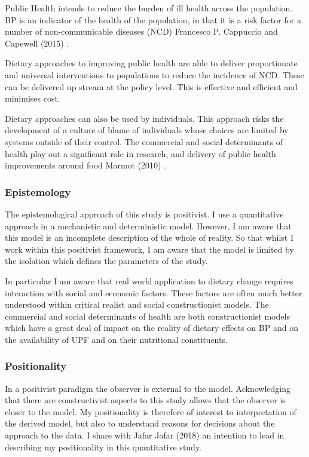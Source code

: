 \documentclass[
]{article}
\begin{document}
Public Health intends to reduce the burden of ill health across the
population. BP is an indicator of the health of the population, in that
it is a risk factor for a number of non-communicable diseases (NCD)
Francesco P. Cappuccio and Capewell (2015) .

Dietary approaches to improving public health are able to deliver
proportionate and universal interventions to populations to reduce the
incidence of NCD. These can be delivered up stream at the policy level.
This is effective and efficient and minimises cost.

Dietary approaches can also be used by individuals. This approach risks
the development of a culture of blame of individuals whose choices are
limited by systems outside of their control. The commercial and social
determinants of health play out a significant role in research, and
delivery of public health improvements around food Marmot (2010) .

\hypertarget{epistemology}{%
\subsubsection{Epistemology}\label{epistemology}}

The epistemological approach of this study is positivist. I use a
quantitative approach in a mechanistic and deterministic model. However,
I am aware that this model is an incomplete description of the whole of
reality. So that whilst I work within this positivist framework, I am
aware that the model is limited by the isolation which defines the
parameters of the study.

In particular I am aware that real world application to dietary change
requires interaction with social and economic factors. These factors are
often much better understood within critical realist and social
constructionist models. The commercial and social determinants of health
are both constructionist models which have a great deal of impact on the
reality of dietary effects on BP and on the availability of UPF and on
their nutritional constituents.

\hypertarget{positionality}{%
\subsubsection{Positionality}\label{positionality}}

In a positivist paradigm the observer is external to the model.
Acknowledging that there are constructivist aspects to this study allows
that the observer is closer to the model. My positionality is therefore
of interest to interpretation of the derived model, but also to
understand reasons for decisions about the approach to the data. I share
with Jafar Jafar (2018) an intention to lead in describing my
positionality in this quantitative study.
\end{document}
